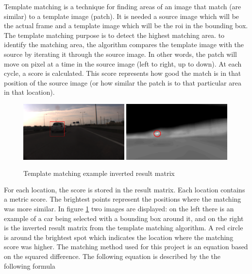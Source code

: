 Template matching is a technique for finding areas of an image that match (are similar) to a template image (patch). It is needed a source image which will be the actual frame and a template image which will be the \gls{roi} in the bounding box. The template matching purpose is to detect the highest matching area. to identify the matching area, the algorithm compares the template image with the source by iterating it through the source image. In other words, the patch will move on pixel at a time in the source image  (left to right, up to down). At each cycle, a score is calculated. This score represents how good the match is in that position of the source image (or how similar the patch is to that particular area in that location). 

\begin{figure}[htp]
	
	\centering
	\includegraphics[width=0.49\textwidth]{caplabel/imgs/resultmat.png}\hfill
	\includegraphics[width=0.49\textwidth]{caplabel/imgs/resultmat2.png}
	
	\caption{Template matching example inverted result matrix}
	\label{fig:resultmat}
	
\end{figure}

For each location, the score is stored in the result matrix. Each location contains a metric score. The brightest points represent the positions where the matching was more similar. In figure \ref{fig:resultmat} two images are displayed: on the left there is an example of a car being selected with a bounding box around it, and on the right is the inverted result matrix from the template matching algorithm. A red circle is around the brightest spot which indicates the location where the matching score was higher. The matching method used for this project is an equation based on the squared difference. The following equation is described by the the following formula

